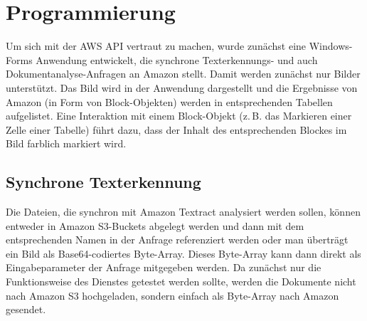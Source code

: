 \documentclass{whswinvcbook}
\begin{document}
\chapter{Programmierung}
Um sich mit der AWS API vertraut zu machen, wurde zunächst eine Windows-Forms Anwendung entwickelt, die synchrone Texterkennungs- und auch Dokumentanalyse-Anfragen an Amazon stellt. Damit werden zunächst nur Bilder unterstützt. Das Bild wird in der Anwendung dargestellt und die Ergebnisse von Amazon (in Form von Block-Objekten) werden in entsprechenden Tabellen aufgelistet. Eine Interaktion mit einem Block-Objekt (z.\,B. das Markieren einer Zelle einer Tabelle) führt dazu, dass der Inhalt des entsprechenden Blockes im Bild farblich markiert wird.
\section{Synchrone Texterkennung}
Die Dateien, die synchron mit Amazon Textract analysiert werden sollen, können entweder in Amazon S3-Buckets abgelegt werden und dann mit dem entsprechenden Namen in der Anfrage referenziert werden oder man überträgt ein Bild als Base64-codiertes Byte-Array. Dieses Byte-Array kann dann direkt als Eingabeparameter der Anfrage mitgegeben werden. Da zunächst nur die Funktionsweise des Dienstes getestet werden sollte, werden die Dokumente nicht nach Amazon S3 hochgeladen, sondern einfach als Byte-Array nach Amazon gesendet.
\end{document}
